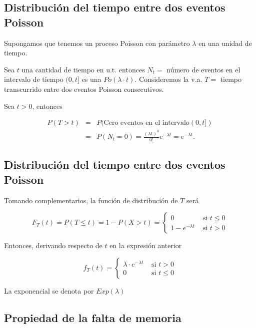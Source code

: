 \documentclass[]{book}
\begin{document}
\hypertarget{distribuciuxf3n-del-tiempo-entre-dos-eventos-poisson}{%
\subsection{Distribución del tiempo entre dos eventos Poisson}\label{distribuciuxf3n-del-tiempo-entre-dos-eventos-poisson}}

Supongamos que tenemos un proceso Poisson con parámetro \(\lambda\) en una unidad de tiempo.

Sea \(t\) una cantidad de tiempo en u.t. entonces \(N_{t}=\) número de eventos en el intervalo de tiempo \((0,t]\) es una \(Po(\lambda\cdot t)\). Consideremos la v.a. \(T=\) tiempo transcurrido entre dos eventos Poisson consecutivos.

Sea \(t>0\), entonces

\[
\begin{eqnarray*}
P(T>t)&=&P(\mbox{Cero eventos en el intervalo}(0,t])\\
&=&P(N_{t}=0)=
         \frac{(\lambda t)^0}{0!} e^{-\lambda
         t}=e^{-\lambda t}.
\end{eqnarray*}
\]

\hypertarget{distribuciuxf3n-del-tiempo-entre-dos-eventos-poisson-1}{%
\subsection{Distribución del tiempo entre dos eventos Poisson}\label{distribuciuxf3n-del-tiempo-entre-dos-eventos-poisson-1}}

Tomando complementarios, la función de distribución de \(T\) será

\[
F_{T}(t)= P(T\leq t)=1-P(X>t)=\left\{\begin{array}{ll} 0 &\mbox{ si } t\leq 0\\
  1-e^{-\lambda t}& \mbox{ si } t>0\end{array}\right.
\]

Entonces, derivando respecto de \(t\) en la expresión anterior

\[
f_{T}(t)=\left\{\begin{array}{ll}\lambda \cdot e^{-\lambda t} & \mbox{ si }  t>0\\
0 & \mbox{ si } t\leq 0 \end{array}\right.
\]

La exponencial se denota por \(Exp(\lambda)\)

\hypertarget{propiedad-de-la-falta-de-memoria-2}{%
\subsection{Propiedad de la falta de memoria}\label{propiedad-de-la-falta-de-memoria-2}}
\end{document}
